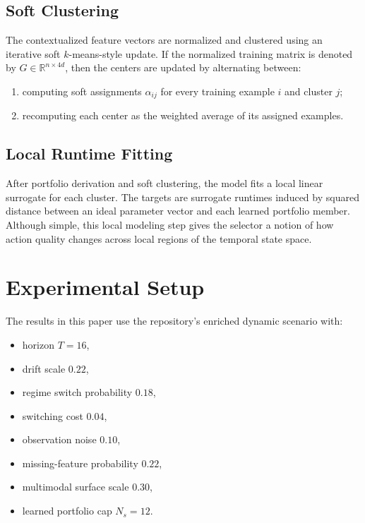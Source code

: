 \documentclass[conference]{IEEEtran}
\begin{document}
\subsection{Soft Clustering}

The contextualized feature vectors are normalized and clustered using an iterative soft $k$-means-style update. If the normalized training matrix is denoted by $G \in \mathbb{R}^{n \times 4d}$, then the centers are updated by alternating between:
\begin{enumerate}
\item computing soft assignments $\alpha_{ij}$ for every training example $i$ and cluster $j$;
\item recomputing each center as the weighted average of its assigned examples.
\end{enumerate}

\subsection{Local Runtime Fitting}

After portfolio derivation and soft clustering, the model fits a local linear surrogate for each cluster. The targets are surrogate runtimes induced by squared distance between an ideal parameter vector and each learned portfolio member. Although simple, this local modeling step gives the selector a notion of how action quality changes across local regions of the temporal state space.

\section{Experimental Setup}

The results in this paper use the repository's enriched dynamic scenario with:
\begin{itemize}
\item horizon $T = 16$,
\item drift scale $0.22$,
\item regime switch probability $0.18$,
\item switching cost $0.04$,
\item observation noise $0.10$,
\item missing-feature probability $0.22$,
\item multimodal surface scale $0.30$,
\item learned portfolio cap $N_s = 12$.
\end{itemize}
\end{document}

